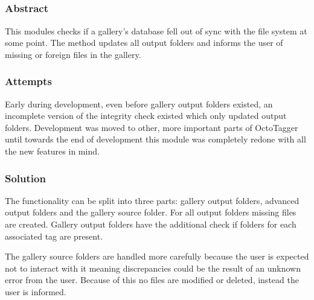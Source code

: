 \subsection{}
\def\kapitelautor{Clemens Stadlbauer}

\subsubsection{Abstract}

This modules checks if a gallery's database fell out of sync with the file
system at some point. The  method updates all output folders and
informs the user of missing or foreign files in the gallery.

\subsubsection{Attempts}

Early during development, even before gallery output folders existed, an
incomplete version of the integrity check existed which only updated output
folders. Development was moved to other, more important parts of OctoTagger
until towards the end of development this module was completely redone with all
the new features in mind.

\subsubsection{Solution} %

The functionality can be split into three parts: gallery output folders,
advanced output folders and the gallery source folder. For all output folders
missing files are created. Gallery output folders have the additional check if
folders for each associated tag are present.

The gallery source folders are handled more carefully because the user is
expected not to interact with it meaning discrepancies could be the result of
an unknown error from the user. Because of this no files are modified or
deleted, instead the user is informed.

